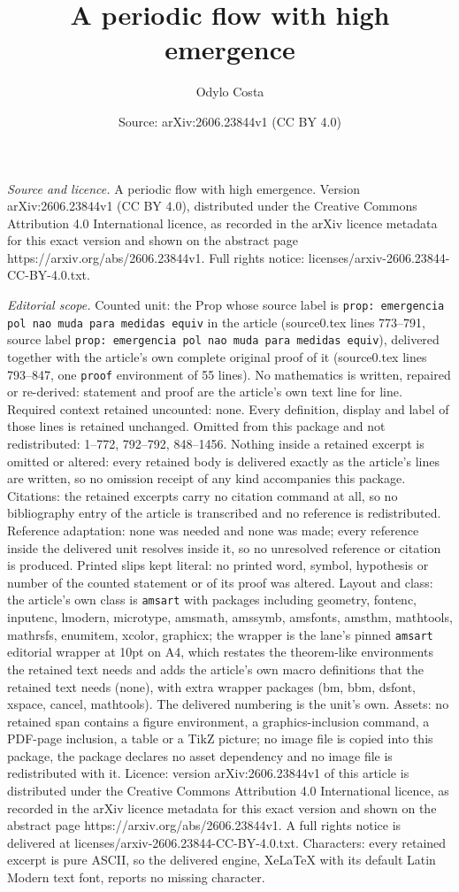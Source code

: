 \documentclass[10pt,a4paper]{amsart}
\title[A periodic flow with high emergence]{A periodic flow with high emergence}
\author{Odylo Costa}
\date{Source: arXiv:2606.23844v1 (CC BY 4.0)}
\begin{document}
\maketitle

\noindent\emph{Source and licence.} A periodic flow with high emergence. Version arXiv:2606.23844v1 (CC BY 4.0), distributed under the Creative Commons Attribution 4.0 International licence, as recorded in the arXiv licence metadata for this exact version and shown on the abstract page https://arxiv.org/abs/2606.23844v1. Full rights notice: licenses/arxiv-2606.23844-CC-BY-4.0.txt.\par\smallskip

\noindent\textit{Editorial scope.} Counted unit: the Prop whose source label is \texttt{prop: emergencia pol nao muda para medidas equiv} in the article (source0.tex lines 773--791, source label \texttt{prop: emergencia pol nao muda para medidas equiv}), delivered together with the article's own complete original proof of it (source0.tex lines 793--847, one \texttt{proof} environment of 55 lines). No mathematics is written, repaired or re-derived: statement and proof are the article's own text line for line. Required context retained uncounted: none. Every definition, display and label of those lines is retained unchanged. Omitted from this package and not redistributed: 1--772, 792--792, 848--1456. Nothing inside a retained excerpt is omitted or altered: every retained body is delivered exactly as the article's lines are written, so no omission receipt of any kind accompanies this package. Citations: the retained excerpts carry no citation command at all, so no bibliography entry of the article is transcribed and no reference is redistributed. Reference adaptation: none was needed and none was made; every reference inside the delivered unit resolves inside it, so no unresolved reference or citation is produced. Printed slips kept literal: no printed word, symbol, hypothesis or number of the counted statement or of its proof was altered. Layout and class: the article's own class is \texttt{amsart} with packages including geometry, fontenc, inputenc, lmodern, microtype, amsmath, amssymb, amsfonts, amsthm, mathtools, mathrsfs, enumitem, xcolor, graphicx; the wrapper is the lane's pinned \texttt{amsart} editorial wrapper at 10pt on A4, which restates the theorem-like environments the retained text needs and adds the article's own macro definitions that the retained text needs (none), with extra wrapper packages (bm, bbm, dsfont, xspace, cancel, mathtools). The delivered numbering is the unit's own. Assets: no retained span contains a figure environment, a graphics-inclusion command, a PDF-page inclusion, a table or a TikZ picture; no image file is copied into this package, the package declares no asset dependency and no image file is redistributed with it. Licence: version arXiv:2606.23844v1 of this article is distributed under the Creative Commons Attribution 4.0 International licence, as recorded in the arXiv licence metadata for this exact version and shown on the abstract page https://arxiv.org/abs/2606.23844v1. A full rights notice is delivered at licenses/arxiv-2606.23844-CC-BY-4.0.txt. Characters: every retained excerpt is pure ASCII, so the delivered engine, XeLaTeX with its default Latin Modern text font, reports no missing character.
\end{document}
